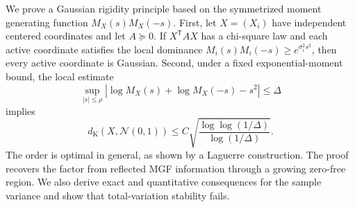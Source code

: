 We prove a Gaussian rigidity principle based on the symmetrized moment generating function $M_X(s)M_X(-s)$. First, let $X=(X_i)$ have independent centered coordinates and let $A\succeq0$. If $X^{\mathsf T}AX$ has a chi-square law and each active coordinate satisfies the local dominance $M_i(s)M_i(-s)\ge e^{\sigma_i^2s^2}$, then every active coordinate is Gaussian. Second, under a fixed exponential-moment bound, the local estimate
\[
\sup_{|s|\le\rho}|\log M_X(s)+\log M_X(-s)-s^2|\le\Delta
\]
implies
\[
d_{\mathrm K}(X,\mathcal N(0,1))
\le C\sqrt{\frac{\log\log(1/\Delta)}{\log(1/\Delta)}}.
\]
The order is optimal in general, as shown by a Laguerre construction. The proof recovers the factor from reflected MGF information through a growing zero-free region. We also derive exact and quantitative consequences for the sample variance and show that total-variation stability fails.
